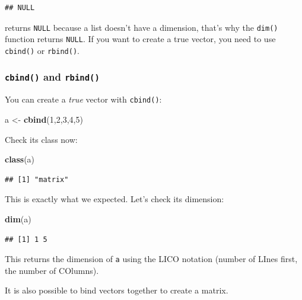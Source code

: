 \documentclass[]{gitbook}
\newenvironment{Shaded}{\begin{snugshade}}{\end{snugshade}}
\newcommand{\DecValTok}[1]{\textcolor[rgb]{0.00,0.00,0.81}{#1}}
\newcommand{\KeywordTok}[1]{\textcolor[rgb]{0.13,0.29,0.53}{\textbf{#1}}}
\newcommand{\NormalTok}[1]{#1}
\newcommand{\StringTok}[1]{\textcolor[rgb]{0.31,0.60,0.02}{#1}}
\theoremstyle{definition}
\theoremstyle{definition}
\theoremstyle{definition}
\theoremstyle{remark}
\begin{document}
\begin{verbatim}
## NULL
\end{verbatim}

returns \texttt{NULL} because a list doesn't have a dimension, that's
why the \texttt{dim()} function returns \texttt{NULL}. If you want to
create a true vector, you need to use \texttt{cbind()} or
\texttt{rbind()}.

\hypertarget{cbind-and-rbind}{%
\subsubsection{\texorpdfstring{\texttt{cbind()} and
\texttt{rbind()}}{cbind() and rbind()}}\label{cbind-and-rbind}}

You can create a \emph{true} vector with \texttt{cbind()}:

\begin{Shaded}
\begin{Highlighting}[]
\NormalTok{a <-}\StringTok{ }\KeywordTok{cbind}\NormalTok{(}\DecValTok{1}\NormalTok{,}\DecValTok{2}\NormalTok{,}\DecValTok{3}\NormalTok{,}\DecValTok{4}\NormalTok{,}\DecValTok{5}\NormalTok{)}
\end{Highlighting}
\end{Shaded}

Check its class now:

\begin{Shaded}
\begin{Highlighting}[]
\KeywordTok{class}\NormalTok{(a)}
\end{Highlighting}
\end{Shaded}

\begin{verbatim}
## [1] "matrix"
\end{verbatim}

This is exactly what we expected. Let's check its dimension:

\begin{Shaded}
\begin{Highlighting}[]
\KeywordTok{dim}\NormalTok{(a)}
\end{Highlighting}
\end{Shaded}

\begin{verbatim}
## [1] 1 5
\end{verbatim}

This returns the dimension of \texttt{a} using the LICO notation (number
of LInes first, the number of COlumns).

It is also possible to bind vectors together to create a matrix.
\end{document}

